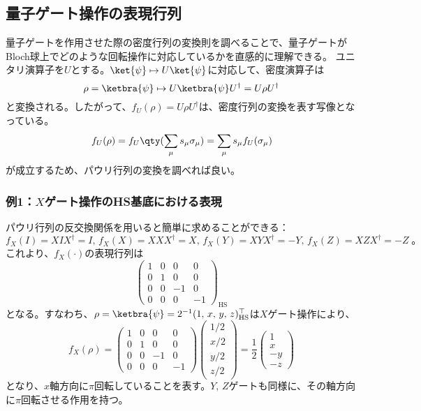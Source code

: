 \documentclass[a4paper,11pt,uplatex]{jsarticle}%
\begin{document}
\newpage
\subsection{量子ゲート操作の表現行列}
量子ゲートを作用させた際の密度行列の変換則を調べることで、量子ゲートがBloch球上でどのような回転操作に対応しているかを直感的に理解できる。
ユニタリ演算子を$U$とする。$\ket{\psi}\mapsto U\ket{\psi}$に対応して、密度演算子は
\begin{equation}
  \rho = \ketbra{\psi}\mapsto U\ketbra{\psi}U^{\dagger} =U\rho U^\dagger
\end{equation}
と変換される。したがって、$f_U(\rho) = U\rho U^{\dagger}$は、密度行列の変換を表す写像となっている。
\begin{equation}
  f_U(\rho) = f_U\qty(\sum_{\mu}s_\mu\sigma_\mu) = \sum_{\mu}s_\mu f_U(\sigma_{\mu})
\end{equation}
が成立するため、パウリ行列の変換を調べれば良い。
\subsubsection*{例1：$X$ゲート操作のHS基底における表現}
パウリ行列の反交換関係を用いると簡単に求めることができる：
\begin{equation}
  f_X(I) = XIX^{\dagger} = I,\,f_X(X) = XXX^{\dagger} = X,\,f_X(Y) = XYX^{\dagger} = -Y,\,f_X(Z) = XZX^{\dagger} = -Z\;。
\end{equation}
これより、$f_X(\cdot)$の表現行列は
\begin{equation}
  \begin{pmatrix}
    1 & 0 & 0 & 0 \\ 0 & 1 & 0 & 0 \\
    0 & 0 & -1 & 0 \\ 0 & 0 & 0 & -1
  \end{pmatrix}_{\text{HS}}
\end{equation}
となる。すなわち、$\rho = \ketbra{\psi} = 2^{-1}(1,\,x,\,y,\,z)_{\text{HS}}^{\top}$は$X$ゲート操作により、
\begin{equation}
  f_X(\rho) = 
  \begin{pmatrix}
    1 & 0 & 0 & 0 \\ 0 & 1 & 0 & 0 \\
    0 & 0 & -1 & 0 \\ 0 & 0 & 0 & -1
  \end{pmatrix}
  \begin{pmatrix}
    1/2 \\ x/2 \\ y/2 \\ z/2
  \end{pmatrix}
  =\frac{1}{2}
  \begin{pmatrix}
    1 \\ x \\ -y \\ -z
  \end{pmatrix}
\end{equation}
となり、$x$軸方向に$\pi$回転していることを表す。$Y,\,Z$ゲートも同様に、その軸方向に$\pi$回転させる作用を持つ。
\end{document}
